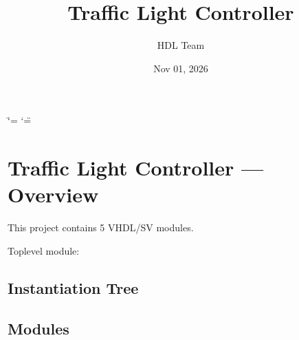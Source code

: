 \documentclass[letterpaper,10pt,english]{sphinxmanual}
\title{Traffic Light Controller}
\date{Nov 01, 2026}
\author{HDL Team}
\begin{document}
\ifdefined\shorthandoff
  \ifnum\catcode`\=\string=\active\shorthandoff{=}\fi
  \ifnum\catcode`\"=\active{}\fi
\fi

\pagestyle{empty}
\sphinxmaketitle
\pagestyle{plain}
\sphinxtableofcontents
\pagestyle{normal}
\label{\detokenize{index::doc}}


\sphinxstepscope


\chapter{Traffic Light Controller — Overview}
\label{\detokenize{overview:traffic-light-controller-overview}}\label{\detokenize{overview::doc}}
\sphinxAtStartPar
This project contains 5 VHDL/SV modules.

\sphinxAtStartPar
Top\sphinxhyphen{}level module: {\hyperref[\detokenize{modules/top/index::doc}]{}}


\section{Instantiation Tree}
\label{\detokenize{overview:instantiation-tree}}


\section{Modules}
\label{\detokenize{overview:modules}}
\end{document}
